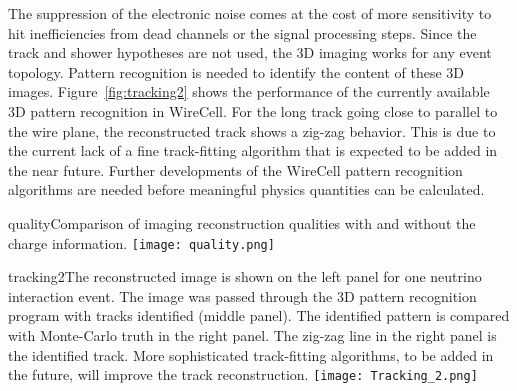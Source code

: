 The suppression of the electronic noise comes at the cost of more
sensitivity to hit inefficiencies from dead channels or the signal processing steps.
 Since the track and shower hypotheses
are not used, the 3D imaging works for any event topology. 
Pattern recognition is needed to identify 
the content of these 3D images. Figure~\ref{fig:tracking2} shows the 
performance of the currently available 3D pattern recognition in
WireCell. For the long track going close to parallel to the wire plane, the reconstructed
track shows a zig-zag behavior. This is due to the current lack of a fine track-fitting algorithm
that is expected to be added in the near future. 
Further developments of the WireCell pattern recognition algorithms
are needed before meaningful physics quantities can be calculated.
%
\begin{cdrfigure}{quality}{Comparison of imaging reconstruction 
qualities with and without the charge information. }
\texttt{[image: quality.png]}
\end{cdrfigure}
%
%
\begin{cdrfigure}{tracking2}{The reconstructed image is shown 
on the left panel for one neutrino interaction event. The image 
was passed through the 3D pattern recognition program with tracks 
identified (middle panel). The identified pattern is compared 
with Monte-Carlo truth in the right panel. The zig-zag line in the right 
panel is the identified track.  More sophisticated track-fitting algorithms, to be added in the future,
will improve the track reconstruction.}
 \texttt{[image: Tracking\_2.png]}
\end{cdrfigure}

